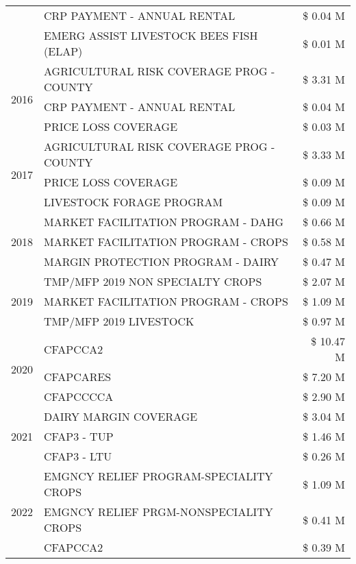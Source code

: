 \begin{tabular}{llr}
 & CRP PAYMENT - ANNUAL RENTAL & \$ 0.04 M \\
 & EMERG ASSIST LIVESTOCK BEES FISH (ELAP) & \$ 0.01 M \\
\cline{1-3}
\multirow[t]{3}{*}{2016} & AGRICULTURAL RISK COVERAGE PROG - COUNTY & \$ 3.31 M \\
 & CRP PAYMENT - ANNUAL RENTAL & \$ 0.04 M \\
 & PRICE LOSS COVERAGE & \$ 0.03 M \\
\cline{1-3}
\multirow[t]{3}{*}{2017} & AGRICULTURAL RISK COVERAGE PROG - COUNTY & \$ 3.33 M \\
 & PRICE LOSS COVERAGE & \$ 0.09 M \\
 & LIVESTOCK FORAGE PROGRAM & \$ 0.09 M \\
\cline{1-3}
\multirow[t]{3}{*}{2018} & MARKET FACILITATION PROGRAM - DAHG & \$ 0.66 M \\
 & MARKET FACILITATION PROGRAM - CROPS & \$ 0.58 M \\
 & MARGIN PROTECTION PROGRAM - DAIRY & \$ 0.47 M \\
\cline{1-3}
\multirow[t]{3}{*}{2019} & TMP/MFP 2019 NON SPECIALTY CROPS & \$ 2.07 M \\
 & MARKET FACILITATION PROGRAM - CROPS & \$ 1.09 M \\
 & TMP/MFP 2019 LIVESTOCK & \$ 0.97 M \\
\cline{1-3}
\multirow[t]{3}{*}{2020} & CFAPCCA2 & \$ 10.47 M \\
 & CFAPCARES & \$ 7.20 M \\
 & CFAPCCCCA & \$ 2.90 M \\
\cline{1-3}
\multirow[t]{3}{*}{2021} & DAIRY MARGIN COVERAGE & \$ 3.04 M \\
 & CFAP3 - TUP & \$ 1.46 M \\
 & CFAP3 - LTU & \$ 0.26 M \\
\cline{1-3}
\multirow[t]{3}{*}{2022} & EMGNCY RELIEF PROGRAM-SPECIALITY CROPS & \$ 1.09 M \\
 & EMGNCY RELIEF PRGM-NONSPECIALITY CROPS & \$ 0.41 M \\
 & CFAPCCA2 & \$ 0.39 M \\
\cline{1-3}
\bottomrule
\end{tabular}
